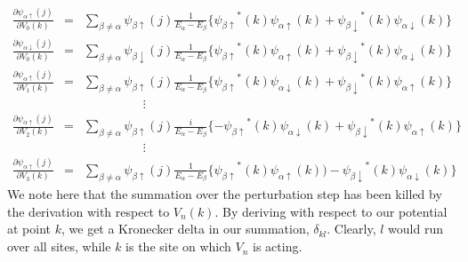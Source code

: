 \documentclass[10pt]{revtex4-1}
\newcommand{\ua}{\uparrow}
\newcommand{\da}{\downarrow}
\newcommand{\paup}{{\psi_{\alpha \ua}}}
\newcommand{\padn}{{\psi_{\alpha \da}}}
\newcommand{\pbup}{{\psi_{\beta \ua}}}
\newcommand{\pbdn}{{\psi_{\beta \da}}}
\begin{document}
\begin{eqnarray}
  \nonumber
  \frac{\partial \paup(j)}{\partial V_0(k)} &=& \sum_{\beta \neq \alpha} \pbup(j) \frac{1}{E_{\alpha}-E_{\beta}} \{ \pbup^*(k) \paup(k) + \pbdn^*(k) \padn(k) \} \\
  \nonumber
  \frac{\partial \padn(j)}{\partial V_0(k)} &=& \sum_{\beta \neq \alpha} \pbdn(j) \frac{1}{E_{\alpha}-E_{\beta}} \{ \pbup^*(k) \paup(k) + \pbdn^*(k) \padn(k) \} \\
  \nonumber
  \frac{\partial \paup(j)}{\partial V_1(k)} &=& \sum_{\beta \neq \alpha} \pbup(j) \frac{1}{E_{\alpha}-E_{\beta}} \{ \pbup^*(k) \padn(k) + \pbdn^*(k) \paup(k) \} \\
  \nonumber
   & & \hspace{2cm}\vdots  \\
  \nonumber
  \frac{\partial \paup(j)}{\partial V_2(k)} &=& \sum_{\beta \neq \alpha} \pbup(j) \frac{i}{E_{\alpha}-E_{\beta}} \{ -\pbup^*(k) \padn(k) + \pbdn^*(k) \paup(k) \} \\
  \nonumber
  & & \hspace{2cm}\vdots  \\
  \nonumber
  \frac{\partial \paup(j)}{\partial V_3(k)} &=& \sum_{\beta \neq \alpha} \pbup(j) \frac{1}{E_{\alpha}-E_{\beta}} \{ \pbup^*(k) \paup(k)) - \pbdn^*(k) \padn(k) \}
\end{eqnarray}
We note here that the summation over the perturbation step has been killed by the derivation with respect to $V_n(k)$.
By deriving with respect to our potential at point $k$, we get a Kronecker delta in our summation, $\delta_{kl}$.
Clearly, $l$ would run over all sites, while $k$ is the site on which $V_n$ is acting.
\end{document}
